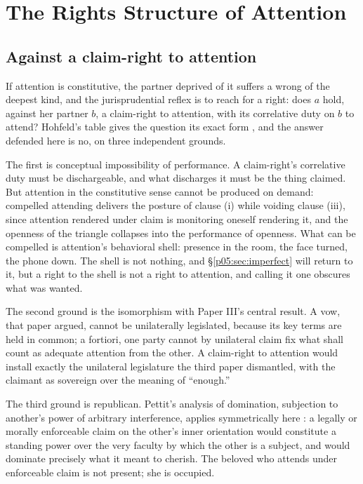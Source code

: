 \section{The Rights Structure of Attention}
\label{p05:sec:rights}

\subsection{Against a claim-right to attention}

If attention is constitutive, the partner deprived of it suffers a wrong of the deepest kind, and the jurisprudential reflex is to reach for a right: does $a$ hold, against her partner $b$, a claim-right to attention, with its correlative duty on $b$ to attend? Hohfeld's table gives the question its exact form \parencite{hohfeld1919}, and the answer defended here is no, on three independent grounds.

The first is conceptual impossibility of performance. A claim-right's correlative duty must be dischargeable, and what discharges it must be the thing claimed. But attention in the constitutive sense cannot be produced on demand: compelled attending delivers the posture of clause (i) while voiding clause (iii), since attention rendered under claim is monitoring oneself rendering it, and the openness of the triangle collapses into the performance of openness. What can be compelled is attention's behavioral shell: presence in the room, the face turned, the phone down. The shell is not nothing, and §\ref{p05:sec:imperfect} will return to it, but a right to the shell is not a right to attention, and calling it one obscures what was wanted.

The second ground is the isomorphism with Paper III's central result. A vow, that paper argued, cannot be unilaterally legislated, because its key terms are held in common; a fortiori, one party cannot by unilateral claim fix what shall count as adequate attention from the other. A claim-right to attention would install exactly the unilateral legislature the third paper dismantled, with the claimant as sovereign over the meaning of ``enough.''

The third ground is republican. Pettit's analysis of domination, subjection to another's power of arbitrary interference, applies symmetrically here \parencite{pettit1997}: a legally or morally enforceable claim on the other's inner orientation would constitute a standing power over the very faculty by which the other is a subject, and would dominate precisely what it meant to cherish. The beloved who attends under enforceable claim is not present; she is occupied.

